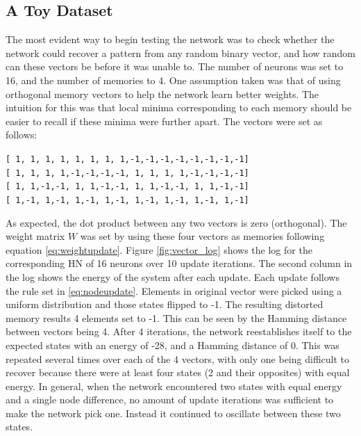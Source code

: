 \documentclass[11pt]{article}
\begin{document}
	\subsection{A Toy Dataset}
	The most evident way to begin testing the network was to check whether the network could recover a pattern from any random binary vector, and how random can these vectors be before it was unable to. 
	The number of neurons was set to 16, and the number of memories to 4. 
	One assumption taken was that of using orthogonal memory vectors to help the network learn better weights.
	The intuition for this was that local minima corresponding to each memory should be easier to recall if these minima were further apart.
	The vectors were set as follows:
	\begin{center}
	\texttt{[\ 1,\ 1,\ 1,\ 1,\ 1,\ 1,\ 1,\ 1,-1,-1,-1,-1,-1,-1,-1,-1]}\\
	\texttt{[\ 1,\ 1,\ 1,\ 1,-1,-1,-1,-1,\ 1,\ 1,\ 1,\ 1,-1,-1,-1,-1]}\\
	\texttt{[\ 1,\ 1,-1,-1,\ 1,\ 1,-1,-1,\ 1,\ 1,-1,-1,\ 1,\ 1,-1,-1]}\\
	\texttt{[\ 1,-1,\ 1,-1,\ 1,-1,\ 1,-1,\ 1,-1,\ 1,-1,\ 1,-1,\ 1,-1]}
	\end{center}
	As expected, the dot product between any two vectors is zero (orthogonal). The weight matrix $W$ was set by using these four vectors as memories following equation \ref{eq:weightupdate}. Figure \ref{fig:vector_log} shows the log for the corresponding HN of 16 neurons over 10 update iterations.
	The second column in the log shows the energy of the system after each update. Each update follows the rule set in \ref{eq:nodeupdate}.
	Elements in original vector were picked using a uniform distribution and those states flipped to -1.
	The resulting distorted memory results 4 elements set to -1. This can be seen by the Hamming distance between vectors being 4. After 4 iterations, the network reestablishes itself to the expected states with an energy of -28, and a Hamming distance of 0.
	This was repeated several times over each of the 4 vectors, with only one being difficult to recover because there were at least four states (2 and their opposites) with equal energy.
	In general, when the network encountered two states with equal energy and a single node difference, no amount of update iterations was sufficient to make the network pick one. Instead it continued to oscillate between these two states.
\end{document}
